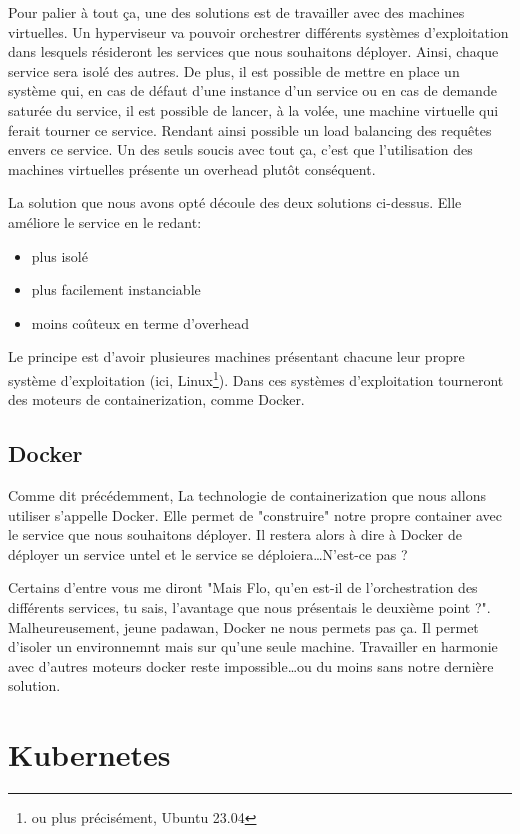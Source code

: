 Pour palier à tout ça, une des solutions est de travailler avec des machines virtuelles. Un hyperviseur va pouvoir orchestrer différents systèmes d'exploitation dans lesquels résideront les services que nous souhaitons déployer. Ainsi, chaque service sera isolé des autres. De plus, il est possible de mettre en place un système qui, en cas de défaut d'une instance d'un service ou en cas de demande saturée du service, il est possible de lancer, à la volée, une machine virtuelle qui ferait tourner ce service. Rendant ainsi possible un load balancing des requêtes envers ce service. Un des seuls soucis avec tout ça, c'est que l'utilisation des machines virtuelles présente un overhead plutôt conséquent.

La solution que nous avons opté découle des deux solutions ci-dessus. Elle améliore le service en le redant:

\begin{itemize}
    \item plus isolé
    \item plus facilement instanciable
    \item moins coûteux en terme d'overhead
\end{itemize}

Le principe est d'avoir plusieures machines présentant chacune leur propre système d'exploitation (ici, Linux\footnote{ou plus précisément, Ubuntu 23.04}). Dans ces systèmes d'exploitation tourneront des moteurs de containerization, comme Docker.

\subsection{Docker}

Comme dit précédemment, La technologie de containerization que nous allons utiliser s'appelle Docker. Elle permet de "construire" notre propre container avec le service que nous souhaitons déployer. Il restera alors à dire à Docker de déployer un service untel et le service se déploiera\dots N'est-ce pas ?

Certains d'entre vous me diront "Mais Flo, qu'en est-il de l'orchestration des différents services, tu sais, l'avantage que nous présentais le deuxième point ?". Malheureusement, jeune padawan, Docker ne nous permets pas ça. Il permet d'isoler un environnemnt mais sur qu'une seule machine. Travailler en harmonie avec d'autres moteurs docker reste impossible\dots ou du moins sans notre dernière solution.
\section{Kubernetes}



